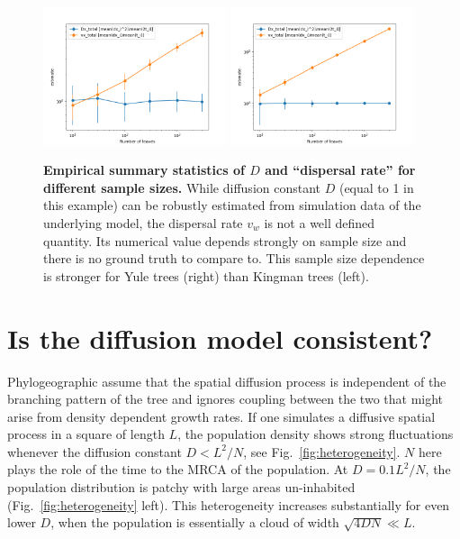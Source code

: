 \documentclass[aps,rmp, onecolumn]{revtex4}
\begin{document}
\begin{figure}
    \includegraphics*[width=0.48\textwidth]{figures/kingman_total_dispersal.png}
    \includegraphics*[width=0.48\textwidth]{figures/yule_total_dispersal.png}
    \caption{\label{fig:D_and_v}{\bf Empirical summary statistics of $D$ and ``dispersal rate'' for different sample sizes.}
    While diffusion constant $D$ (equal to 1 in this example) can be robustly estimated from simulation data of the underlying model, the dispersal rate $v_w$ is not a well defined quantity. Its numerical value depends strongly on sample size and there is no ground truth to compare to. This sample size dependence is stronger for Yule trees (right) than Kingman trees (left). }
\end{figure}

\section*{Is the diffusion model consistent?}
Phylogeographic assume that the spatial diffusion process is independent of the branching pattern of the tree and ignores coupling between the two that might arise from density dependent growth rates.
If one simulates a diffusive spatial process in a square of length $L$, the population density shows strong fluctuations whenever the diffusion constant $D<L^2/N$, see Fig.~\ref{fig:heterogeneity}.
$N$ here plays the role of the time to the MRCA of the population.
At $D=0.1L^2/N$, the population distribution is patchy with large areas un-inhabited (Fig.~\ref{fig:heterogeneity} left).
This heterogeneity increases substantially for even lower $D$, when the population is essentially a cloud of width $\sqrt{4DN}\ll L$.
\end{document}
